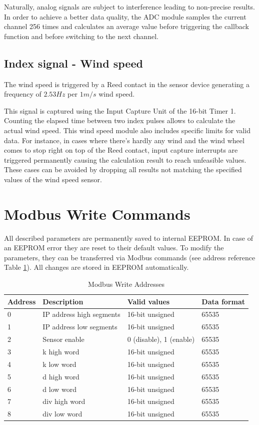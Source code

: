 Naturally, analog signals are subject to interference leading to non-precise results. In order to achieve a better data quality, the ADC module samples the current channel 256 times and calculates an average value before triggering the callback function and before switching to the next channel.

\subsection{Index signal - Wind speed}
The wind speed is triggered by a Reed contact in the sensor device generating a frequency of $2.53 Hz$ per $1 m/s$ wind speed.

This signal is captured using the Input Capture Unit of the 16-bit Timer 1. Counting the elapsed time between two index pulses allows to calculate the actual wind speed. This wind speed module also includes specific limits for valid data. For instance, in cases where there's hardly any wind and the wind wheel comes to stop right on top of the Reed contact, input capture interrupts are triggered permanently causing the calculation result to reach unfeasible values. These cases can be avoided by dropping all results not matching the specified values of the wind speed sensor.

\section{Modbus Write Commands}
All described parameters are permanently saved to internal EEPROM. In case of an EEPROM error they are reset to their default values. To modify the parameters, they can be transferred via Modbus commands (see address reference Table \ref{tab:modbus_write}). All changes are stored in EEPROM automatically.

\begin{table}[ht]
    \centering
    \begin{tabular}{|l|l|l|l|}
    \hline \textbf{Address} & \textbf{Description} & \textbf{Valid values} & \textbf{Data format} \\ 
    \hline
    \hline 0 & IP address high segments & 16-bit unsigned & 65535 \\ 
    \hline 1 & IP address low segments & 16-bit unsigned & 65535 \\ 
    \hline 2 & Sensor enable & 0 (disable), 1 (enable) & 65535 \\ 
    \hline 3 & k high word & 16-bit unsigned & 65535 \\ 
    \hline 4 & k low word & 16-bit unsigned & 65535 \\ 
    \hline 5 & d high word & 16-bit unsigned & 65535 \\ 
    \hline 6 & d low word & 16-bit unsigned & 65535 \\ 
    \hline 7 & div high word & 16-bit unsigned & 65535 \\ 
    \hline 8 & div low word & 16-bit unsigned & 65535 \\ 
    \hline 
    \end{tabular}
    \caption{Modbus Write Addresses}
    \label{tab:modbus_write}
\end{table}


